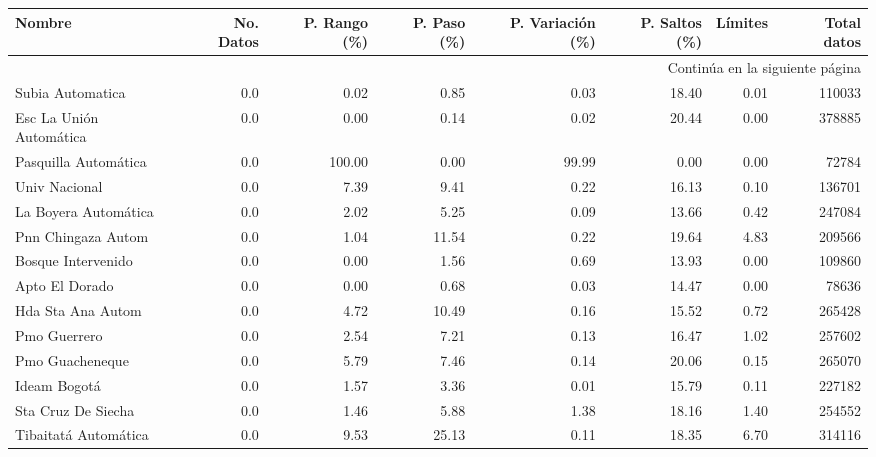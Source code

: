 \begin{enumerate}
\begin{landscape}
\begin{longtable}{p{5cm}rrrrrrr}
                  Nombre &  No. Datos &  P. Rango (\%) &  P. Paso (\%)&  P. Variación (\%)&  P. Saltos (\%)&  Límites &Total datos \\
\midrule
\endhead
\midrule
\multicolumn{8}{r}{{Continúa en la siguiente página}} \\
\midrule
\endfoot
\bottomrule
\endlastfoot
        Subia Automatica &        0.0 &      0.02 &           0.85 &     0.03 &      18.40 &          0.01 &       110033 \\
 Esc La Unión Automática &        0.0 &      0.00 &           0.14 &     0.02 &      20.44 &          0.00 &       378885 \\
    Pasquilla Automática &        0.0 &    100.00 &           0.00 &    99.99 &       0.00 &          0.00 &        72784 \\
           Univ Nacional &        0.0 &      7.39 &           9.41 &     0.22 &      16.13 &          0.10 &       136701 \\
    La Boyera Automática &        0.0 &      2.02 &           5.25 &     0.09 &      13.66 &          0.42 &       247084 \\
      Pnn Chingaza Autom &        0.0 &      1.04 &          11.54 &     0.22 &      19.64 &          4.83 &       209566 \\
      Bosque Intervenido &        0.0 &      0.00 &           1.56 &     0.69 &      13.93 &          0.00 &       109860 \\
          Apto El Dorado &        0.0 &      0.00 &           0.68 &     0.03 &      14.47 &          0.00 &        78636 \\
       Hda Sta Ana Autom &        0.0 &      4.72 &          10.49 &     0.16 &      15.52 &          0.72 &       265428 \\
            Pmo Guerrero &        0.0 &      2.54 &           7.21 &     0.13 &      16.47 &          1.02 &       257602 \\
         Pmo Guacheneque &        0.0 &      5.79 &           7.46 &     0.14 &      20.06 &          0.15 &       265070 \\
            Ideam Bogotá &        0.0 &      1.57 &           3.36 &     0.01 &      15.79 &          0.11 &       227182 \\
      Sta Cruz De Siecha &        0.0 &      1.46 &           5.88 &     1.38 &      18.16 &          1.40 &       254552 \\
    Tibaitatá Automática &        0.0 &      9.53 &          25.13 &     0.11 &      18.35 &          6.70 &       314116 \\

\end{longtable}
\end{landscape}
\end{enumerate}
